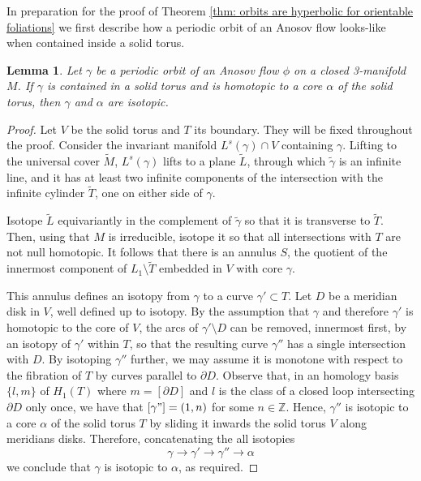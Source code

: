 \documentclass[12pt]{amsart}
\newtheorem{lemma}[theorem]{Lemma}
\theoremstyle{definition}
\theoremstyle{remark}
\newcommand{\Z}{\mathbb{Z}}
\begin{document}
In preparation for the proof of Theorem \ref{thm: orbits are hyperbolic for orientable foliations} we first  describe how a periodic orbit of an Anosov flow looks-like when contained inside a solid torus.


\begin{lemma}\label{lem:isotopic to core}
Let $\gamma$ be a periodic orbit of an Anosov flow $\phi$ on a closed 3-manifold $M$. If $\gamma$ is contained in a solid torus and is homotopic to a core $\alpha$ of the solid torus, then $\gamma$ and $\alpha$ are isotopic.
\end{lemma}


\begin{proof}
Let $V$ be the solid torus and $T$ its boundary. They will be fixed
throughout the proof. Consider the invariant manifold $L^s(\gamma) \cap V$ containing $\gamma$. Lifting to the universal cover $\tilde M$, $L^s(\gamma)$ lifts to a plane $\tilde L$, through which $\tilde\gamma$ is an infinite line, and it has at least two infinite components of the intersection with the infinite cylinder $\tilde T$, one on either side of $\gamma$.

 Isotope $\tilde L$ equivariantly in the complement of $\tilde\gamma$ so that it is transverse to $\tilde T$. Then, using that $M$ is irreducible, isotope it so that all
intersections with $T$ are not null homotopic. 
It follows that there is an annulus $S$, the quotient of the innermost component of $L_1\setminus \tilde T$ embedded in $V$ with core $\gamma$.

This annulus defines an isotopy from $\gamma$ to a curve $\gamma'\subset T$.  
Let $D$ be a meridian disk in $V$, well defined up to isotopy.
By the assumption that $\gamma$ and therefore $\gamma'$ is homotopic to the core of $V$, the arcs of $\gamma'\setminus D$ can be removed, innermost first, by an isotopy of $\gamma'$ within $T$, so that the resulting curve $\gamma''$ has a single intersection with $D$. By isotoping $\gamma''$ further, we may assume it is monotone with respect to the fibration of $T$ by curves parallel to $\partial D$.
Observe that, in an homology basis $\{l,m\}$ of $H_1(T)$ where $m=[\partial D]$ and $l$ is the class of a closed loop intersecting $\partial D$ only once, we have that $[\gamma"]=(1,n)$ for some $n\in\Z$. Hence, $\gamma''$ is isotopic to a core $\alpha$ of the solid torus $T$ by sliding it inwards the solid torus $V$ along meridians disks. Therefore, concatenating the all isotopies 
$$\gamma\to\gamma'\to\gamma ''\to\alpha$$ 
we conclude that $\gamma$ is isotopic to $\alpha$, as required.
\end{proof}
\end{document}
